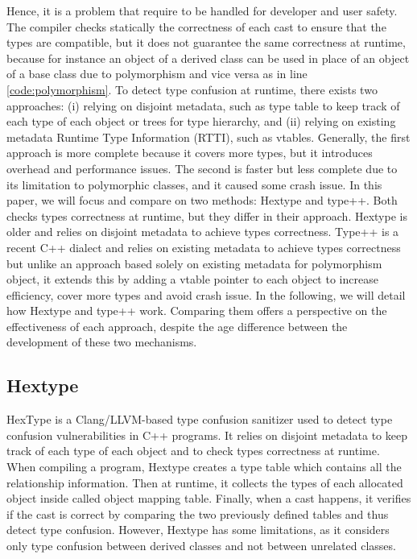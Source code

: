 \documentclass[a4paper,11pt,oneside]{report}
\begin{document}
Hence, it is a problem that require to be handled for developer and user safety.
The compiler checks statically the correctness of each cast to ensure that the
types are compatible, but it does not guarantee the same correctness at runtime, 
because for instance an object of a derived class can be used in place of an
object of a base class due to polymorphism and vice versa as in line
\ref{code:polymorphism}.  To detect type confusion at runtime, there exists two
approaches: (i) relying on disjoint metadata, such as type table to keep track
of each type of each object or trees for type hierarchy, and (ii) relying on
existing metadata Runtime Type Information (RTTI), such as vtables. 
Generally, the first approach is more complete because it covers more types, but
it introduces overhead and performance issues. The second is faster but less
complete due to its limitation to polymorphic classes, and it caused some crash
issue.  In this paper, we will focus and compare on two methods: Hextype and
type++.  Both checks types correctness at runtime, but they differ in their
approach. Hextype is older and relies on disjoint metadata to achieve types
correctness.  Type++ is a recent C++ dialect and relies on existing metadata to
achieve types correctness but unlike an approach based solely on existing
metadata for polymorphism object, it extends this by adding a vtable pointer to
each object to increase efficiency, cover more types and avoid crash issue. In
the following, we will detail how Hextype and type++ work.  Comparing them
offers a perspective on the effectiveness of each approach, despite the age
difference between the development of these two mechanisms.

\subsection{Hextype}

HexType is a Clang/LLVM-based type confusion sanitizer used to detect type
confusion vulnerabilities in C++ programs.  It relies on disjoint metadata to
keep track of each type of each object and to check types correctness at
runtime. When compiling a program, Hextype creates a type table which contains
all the relationship information. Then at runtime, it collects the types 
of each allocated object inside called object mapping table. Finally, when a cast happens,
it verifies if the cast is correct by comparing the two previously defined tables and 
thus detect type confusion. However, Hextype has some limitations, as it considers only 
type confusion between derived classes and not between unrelated classes.
\end{document}
